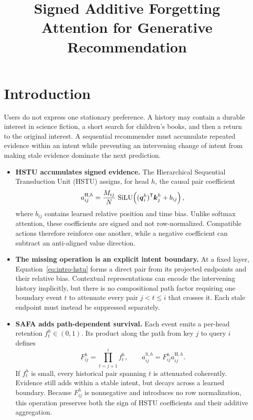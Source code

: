 \documentclass[11pt,letterpaper,logo]{yalearxiv}
\title{Signed Additive Forgetting Attention for Generative Recommendation}
\author{}
\begin{document}
\maketitle


\section{Introduction}
\label{sec:intro}

Users do not express one stationary preference.  A history may contain a
durable interest in science fiction, a short search for children's books, and
then a return to the original interest.  A sequential recommender must
accumulate repeated evidence within an intent while preventing an intervening
change of intent from making stale evidence dominate the next prediction.

\begin{itemize}[leftmargin=1.4em,itemsep=5pt,topsep=2pt]

  \item \textbf{HSTU accumulates signed evidence.}
  The Hierarchical Sequential Transduction Unit (HSTU)
  \citep{zhai2024actions} assigns, for head $h$, the causal pair coefficient
  \begin{equation}
    a_{ij}^{\mathrm{H},h}
    = \frac{M_{ij}}{N}\,
      \operatorname{SiLU}\!\left((\boldsymbol{q}_i^h)^{\mathsf{T}}\boldsymbol{k}_j^h+b_{ij}\right),
    \label{eq:intro-hstu}
  \end{equation}
  where $b_{ij}$ contains learned relative position and time bias.  Unlike
  softmax attention, these coefficients are signed and not row-normalized.
  Compatible actions therefore reinforce one another, while a negative
  coefficient can subtract an anti-aligned value direction.

  \item \textbf{The missing operation is an explicit intent boundary.}
  At a fixed layer, Equation~\eqref{eq:intro-hstu} forms a direct pair from its
  projected endpoints and their relative bias.  Contextual representations can
  encode the intervening history implicitly, but there is no compositional
  path factor requiring one boundary event $t$ to attenuate every pair
  $j<t\leq i$ that crosses it.  Each stale endpoint must instead be suppressed
  separately.

  \item \textbf{SAFA adds path-dependent survival.}
  Each event emits a per-head retention $f_t^h\in(0,1)$.  Its product along the
  path from key $j$ to query $i$ defines
  \begin{equation}
    F_{ij}^h=\prod_{t=j+1}^{i}f_t^h,
    \qquad
    a_{ij}^{\mathrm{S},h}=F_{ij}^h a_{ij}^{\mathrm{H},h}.
    \label{eq:intro-safa}
  \end{equation}
  If $f_t^h$ is small, every historical pair spanning $t$ is attenuated
  coherently.  Evidence still adds within a stable intent, but decays across a
  learned boundary.  Because $F_{ij}^h$ is nonnegative and introduces no row
  normalization, this operation preserves both the sign of HSTU coefficients
  and their additive aggregation.

\end{itemize}
\end{document}
